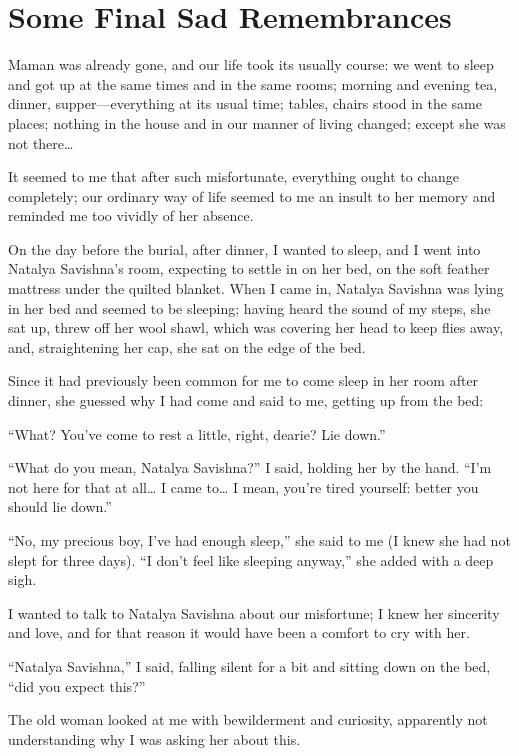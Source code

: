 \chapter{Some Final Sad Remembrances} %

Maman was already gone, and our life took its usually course: we went to sleep and got up at the same times and in the same rooms; morning and evening tea, dinner, supper---everything at its usual time; tables, chairs stood in the same places; nothing in the house and in our manner of living changed; except she was not there\ldots{}

It seemed to me that after such misfortunate, everything ought to change completely; our ordinary way of life seemed to me an insult to her memory and reminded me too vividly of her absence.

On the day before the burial, after dinner, I wanted to sleep, and I went into Natalya Savishna's room, expecting to settle in on her bed, on the soft feather mattress under the quilted blanket. When I came in, Natalya Savishna was lying in her bed and seemed to be sleeping; having heard the sound of my steps, she sat up, threw off her wool shawl, which was covering her head to keep flies away, and, straightening her cap, she sat on the edge of the bed. 

Since it had previously been common for me to come sleep in her room after dinner, she guessed why I had come and said to me, getting up from the bed:

``What? You've come to rest a little, right, dearie? Lie down.'' %

``What do you mean, Natalya Savishna?'' I said, holding her by the hand. ``I'm not here for that at all\ldots{} I came to\ldots{} I mean, you're tired yourself: better you should lie down.'' %

``No, my precious boy, I've had enough sleep,'' she said to me (I knew she had not slept for three days). ``I don't feel like sleeping anyway,'' she added with a deep sigh. %

I wanted to talk to Natalya Savishna about our misfortune; I knew her sincerity and love, and for that reason it would have been a comfort to cry with her.

``Natalya Savishna,'' I said, falling silent for a bit and sitting down on the bed, ``did you expect this?'' %

The old woman looked at me with bewilderment and curiosity, apparently not understanding why I was asking her about this.

